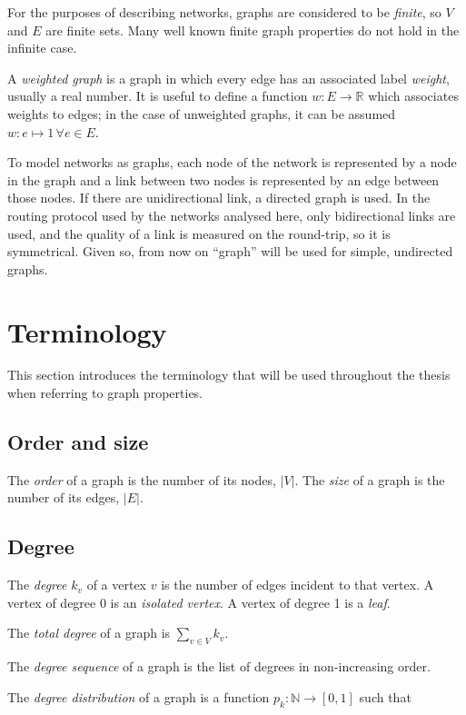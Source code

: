 \documentclass[a4paper,11pt,twoside,openright]{memoir}
\begin{document}
For the purposes of describing networks, graphs are considered to be
\emph{finite}, so $V$ and $E$ are finite sets. Many well known finite
graph properties do not hold in the infinite case.

A \emph{weighted graph} is a graph in which every edge has an associated
label \emph{weight}, usually a real number. It is useful to define a
function $w: E \rightarrow \mathbb{R}$ which associates weights to
edges; in the case of unweighted graphs, it can be assumed
$w: e \mapsto 1\, \forall e \in E$.

To model networks as graphs, each node of the network is represented by
a node in the graph and a link between two nodes is represented by an
edge between those nodes. If there are unidirectional link, a directed
graph is used. In the routing protocol used by the networks analysed here,
only bidirectional links are used, and the quality of a link is measured
on the round-trip, so it is symmetrical. Given so, from now on ``graph''
will be used for simple, undirected graphs.

\section{Terminology}\label{terminology}

This section introduces the terminology that will be used throughout
the thesis when referring to graph properties.

\subsection{Order and size}\label{order-and-size}

The \emph{order} of a graph is the number of its nodes, $|V|$. The
\emph{size} of a graph is the number of its edges, $|E|$.

\subsection{Degree}\label{degree}

The \emph{degree} $k_v$ of a vertex $v$ is the number of edges incident
to that vertex. A vertex of degree 0 is an \emph{isolated vertex}. A
vertex of degree 1 is a \emph{leaf}.

The \emph{total degree} of a graph is $\sum_{v \in V} k_v$.

The \emph{degree sequence} of a graph is the list of degrees in
non-increasing order.

The \emph{degree distribution} of a graph is a function
$p_k: \mathbb{N} \rightarrow [0, 1]$ such that
\end{document}
